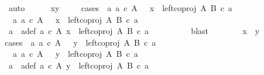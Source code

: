 \begin{isabellebody}
\ auto\isanewline
\isanewline
\ \ \ \ \isamarkupfalse%
\ {\isachardoublequoteopen}x{\isacharequal}{\kern0pt}y{\isachardoublequoteclose}\isanewline
\ \ \ \ \isamarkupfalse%
{\isacharparenleft}{\kern0pt}cases\ {\isachardoublequoteopen}{\isasymexists}\ a{\isachardot}{\kern0pt}\ a\ {\isasymin}\isactrlsub c\ A\ \ {\isasymand}\ x\ {\isacharequal}{\kern0pt}\ left{\isacharunderscore}{\kern0pt}coproj\ A\ B\ {\isasymcirc}\isactrlsub c\ a{\isachardoublequoteclose}{\isacharparenright}{\kern0pt}\isanewline
\ \ \ \ \ \ \isamarkupfalse%
\ {\isachardoublequoteopen}{\isasymexists}\ a{\isachardot}{\kern0pt}\ a\ {\isasymin}\isactrlsub c\ A\ \ {\isasymand}\ x\ {\isacharequal}{\kern0pt}\ left{\isacharunderscore}{\kern0pt}coproj\ A\ B\ {\isasymcirc}\isactrlsub c\ a{\isachardoublequoteclose}\isanewline
\ \ \ \ \ \ \isamarkupfalse%
\ \isamarkupfalse%
\ a\ \ a{\isacharunderscore}{\kern0pt}def{\isacharcolon}{\kern0pt}\ {\isachardoublequoteopen}a\ {\isasymin}\isactrlsub c\ A{\isachardoublequoteclose}\ {\isachardoublequoteopen}x\ {\isacharequal}{\kern0pt}\ left{\isacharunderscore}{\kern0pt}coproj\ A\ B\ {\isasymcirc}\isactrlsub c\ a{\isachardoublequoteclose}\isanewline
\ \ \ \ \ \ \ \ \isamarkupfalse%
\ blast\isanewline
\ \ \ \ \ \ \isamarkupfalse%
\ {\isachardoublequoteopen}x\ {\isacharequal}{\kern0pt}\ y{\isachardoublequoteclose}\isanewline
\ \ \ \ \ \ \isamarkupfalse%
{\isacharparenleft}{\kern0pt}cases\ {\isachardoublequoteopen}{\isasymexists}\ a{\isachardot}{\kern0pt}\ a\ {\isasymin}\isactrlsub c\ A\ \ {\isasymand}\ y\ {\isacharequal}{\kern0pt}\ left{\isacharunderscore}{\kern0pt}coproj\ A\ B\ {\isasymcirc}\isactrlsub c\ a{\isachardoublequoteclose}{\isacharparenright}{\kern0pt}\isanewline
\ \ \ \ \ \ \ \ \isamarkupfalse%
\ {\isachardoublequoteopen}{\isasymexists}\ a{\isachardot}{\kern0pt}\ a\ {\isasymin}\isactrlsub c\ A\ \ {\isasymand}\ y\ {\isacharequal}{\kern0pt}\ left{\isacharunderscore}{\kern0pt}coproj\ A\ B\ {\isasymcirc}\isactrlsub c\ a{\isachardoublequoteclose}\isanewline
\ \ \ \ \ \ \ \ \isamarkupfalse%
\ \isamarkupfalse%
\ a{\isacharprime}{\kern0pt}\ \ a{\isacharprime}{\kern0pt}{\isacharunderscore}{\kern0pt}def{\isacharcolon}{\kern0pt}\ {\isachardoublequoteopen}a{\isacharprime}{\kern0pt}\ {\isasymin}\isactrlsub c\ A{\isachardoublequoteclose}\ {\isachardoublequoteopen}y\ {\isacharequal}{\kern0pt}\ left{\isacharunderscore}{\kern0pt}coproj\ A\ B\ {\isasymcirc}\isactrlsub c\ a{\isacharprime}{\kern0pt}{\isachardoublequoteclose}\isanewline

\end{isabellebody}
